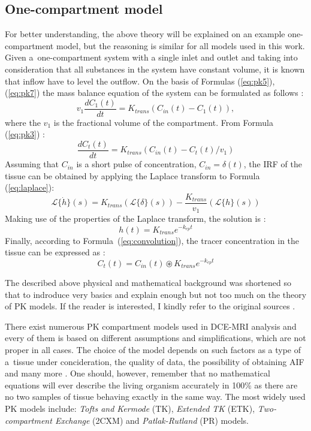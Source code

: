 \subsection{One-compartment model}
For better understanding, the above theory will be explained on an example one-compartment model, but the reasoning is similar for all models used in this work. Given a~one-compartment system with a single inlet and outlet and taking into consideration that all substances in the system have constant volume, it is known that inflow have to level the outflow. On the basis of Formulas (\ref{eq:pk5}), (\ref{eq:pk7}) the mass balance equation of the system can be formulated as follows \cite{thesis}:
\begin{equation}
v_1\frac{dC_1(t)}{dt} = K_{trans}(C_{in}(t)-C_1(t)),
\end{equation}
where the $v_1$ is the fractional volume of the compartment. From Formula (\ref{eq:pk3}) \cite{thesis}:
\begin{equation}
\frac{dC_t(t)}{dt} = K_{trans}(C_{in}(t)-C_t(t)/v_1)
\label{eq:laplace}
\end{equation}
Assuming that $C_{in}$ is a short pulse of concentration, $C_{in}=\delta(t)$, the IRF of the tissue can be obtained by applying the Laplace transform to Formula (\ref{eq:laplace}): 
\begin{equation}
\mathcal{L}\{\dot{h}\}(s) = K_{trans}(\mathcal{L}\{\delta\}(s)) - \frac{K_{trans}}{v_1}(\mathcal{L}\{h\}(s))
\end{equation}
Making use of the properties of the Laplace transform, the solution is \cite{thesis}:
\begin{equation}
h(t) = K_{trans}e^{-k_{ep}t}
\end{equation}
Finally, according to Formula~(\ref{eq:convolution}), the tracer concentration in the tissue can be expressed as \cite{thesis}:
\begin{equation}
	C_{t}(t) = C_{in}(t)\circledast  K_{trans}e^{-k_{ep}t} 
\end{equation}


The described above physical and mathematical background was shortened so that to indroduce very basics and explain enough but not too much on the theory of PK models. If the reader is interested, I kindly refer to the original sources \cite{sourbron2011scope, thesis}. 

There exist numerous PK compartment models used in DCE-MRI analysis and every of them is based on different assumptions and simplifications, which are not proper in all cases. The choice of the model depends on such factors as a type of a~tissue under concideration, the quality of data, the possibility of obtaining AIF and many more \cite{khalifa2014models}. One should, however, remember that no mathematical equations will ever describe the living organism accurately in 100\% as there are no two samples of tissue behaving exactly in the same way. The most widely used PK models include: \textit{Tofts and Kermode} (TK), \textit{Extended TK} (ETK), \textit{Two-compartment Exchange} (2CXM) and \textit{Patlak-Rutland} (PR) models.  

